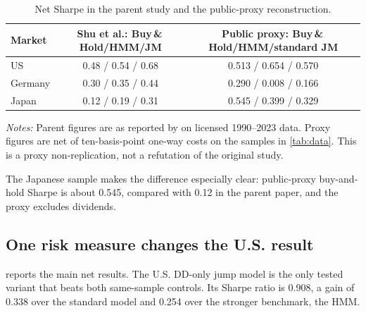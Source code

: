 \documentclass[11pt]{article}
\newcommand{\BH}{Buy\,\&\,Hold}
\begin{document}
\begin{table}[t]
\centering
\caption{Net Sharpe in the parent study and the public-proxy reconstruction.}
\label{tab:parentproxy}
\begin{threeparttable}
\begin{tabular}{l c c}
\toprule
Market & Shu et al.: \BH{}/HMM/JM & Public proxy: \BH{}/HMM/standard JM \\
\midrule
US & 0.48 / 0.54 / 0.68 & 0.513 / 0.654 / 0.570 \\
Germany & 0.30 / 0.35 / 0.44 & 0.290 / 0.008 / 0.166 \\
Japan & 0.12 / 0.19 / 0.31 & 0.545 / 0.399 / 0.329 \\
\bottomrule
\end{tabular}
\begin{tablenotes}[flushleft]\footnotesize
\item \emph{Notes:} Parent figures are as reported by \citet{shu2024} on
licensed 1990--2023 data. Proxy figures are net of ten-basis-point one-way costs
on the samples in \cref{tab:data}. This is a proxy non-replication, not a
refutation of the original study.
\end{tablenotes}
\end{threeparttable}
\end{table}

The Japanese sample makes the difference especially clear: public-proxy
buy-and-hold Sharpe is about 0.545, compared with 0.12 in the parent paper, and
the proxy excludes dividends.

\subsection{One risk measure changes the U.S. result}

 reports the main net results. The U.S. DD-only jump model
is the only tested variant that beats both same-sample controls. Its Sharpe ratio
is 0.908, a gain of 0.338 over the standard model and 0.254 over the stronger
benchmark, the HMM.
\end{document}
